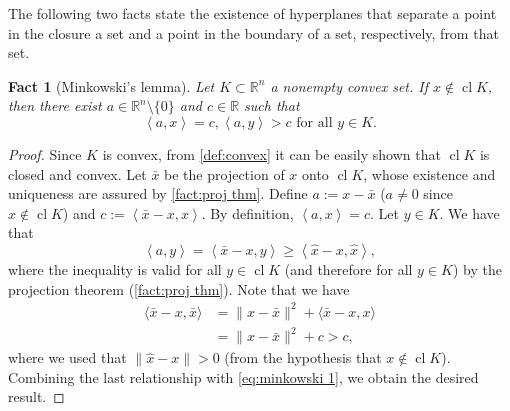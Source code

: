 \documentclass[smallextended,numbook,nospthms]{svjour3}
\theoremstyle{plain}
\newtheorem{fact}[theorem]{Fact}
\theoremstyle{definition}
\def\RR{\mathds R}
\newcommand{\scal}[2]{\left\langle{#1},{#2}  \right\rangle}
\begin{document}
The following two facts state the existence of hyperplanes that separate a point in the closure a set and a point in the boundary of a set, respectively, from that set.
\begin{fact}[Minkowski's lemma]\label{fact:minkowski}
	Let $K \subset \RR^n$ a nonempty convex set. If $x \notin \operatorname{cl} K$, then there exist $a \in \RR^n \setminus \{0\}$ and $c \in \RR$ such that
	\[
	\scal{a}{x}=c, \scal{a}{y}>c \text{ for all } y \in K.
	\]
\end{fact}
\begin{proof}
	Since $K$ is convex, from \cref{def:convex} it can be easily shown that $\operatorname{cl} K$ is closed and convex. Let $\bar{x}$ be the projection of $x$ onto $\operatorname{cl} K$, whose existence and uniqueness are assured by \cref{fact:proj thm}.
	Define $a:=x-\bar{x}$ ($a \not=0$ since $x \notin \operatorname{cl} K$) and $c:=\scal{\bar{x}-x}{x}$. By definition, $\scal{a}{x}=c$. Let $y \in K$. We have that
	\[
	\scal{a}{y}=\scal{\bar{x}-x}{y}\geq \scal{\hat{x}-x}{\hat{x}} \label{eq:minkowski 1},
	\]
	where the inequality is valid for all $y \in \operatorname{cl} K$ (and therefore for all $y \in K$) by the projection theorem (\cref{fact:proj thm}). Note that we have
	\begin{align}
		\langle\bar{x}-x, \bar{x}\rangle &=\|x-\bar{x}\|^{2}+\langle\bar{x}-x, x\rangle \\
		&=\|x-\bar{x}\|^{2}+c>c,
	\end{align}
	where we used that $\| \hat{x}-x \| >0$ (from the hypothesis that $x \notin \operatorname{cl} K$). Combining the last relationship with \cref{eq:minkowski 1}, we obtain the desired result.
\end{proof}
\end{document}
